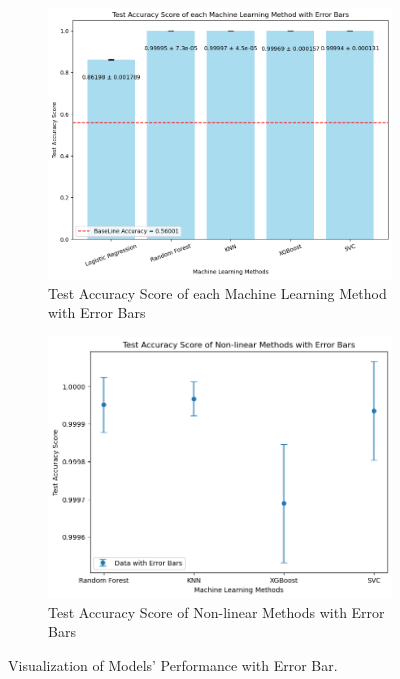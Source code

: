 \documentclass{article}
\begin{document}
\begin{figure}[h]
    \centering
    \begin{subfigure}{0.46\textwidth}
        \includegraphics[width=\linewidth]{errorbar1_label.png}
        \caption{Test Accuracy Score of each Machine Learning Method with Error Bars}
        \label{fig:subfig1}
    \end{subfigure}
    \hfill
    \begin{subfigure}{0.46\textwidth}
        \includegraphics[width=\linewidth]{errorbar2.png}
        \caption{Test Accuracy Score of Non-linear Methods with Error Bars}
        \label{fig:subfig2}
    \end{subfigure}
    \caption{Visualization of Models' Performance with Error Bar.}
    \label{fig:both}
\end{figure}
\end{document}
